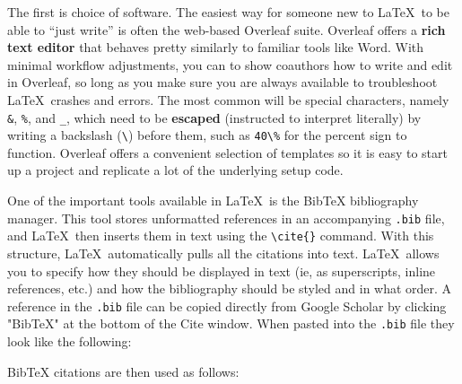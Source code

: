The first is choice of software. The easiest way
for someone new to \LaTeX\ to be able to ``just write''
is often the web-based Overleaf suite.
Overleaf offers a \textbf{rich text editor}
that behaves pretty similarly to familiar tools like Word.
With minimal workflow adjustments, you can
to show coauthors how to write and edit in Overleaf,
so long as you make sure you are always available to troubleshoot
\LaTeX\ crashes and errors.
The most common will be special characters, namely
\texttt{\&}, \texttt{\%}, and \texttt{\_},
which need to be \textbf{escaped} (instructed to interpret literally)
by writing a backslash (\texttt{\textbackslash}) before them,
such as  \texttt{40\textbackslash\%} for the percent sign to function.
Overleaf offers a convenient selection of templates
so it is easy to start up a project
and replicate a lot of the underlying setup code.

One of the important tools available in \LaTeX\ is the BibTeX bibliography manager.
This tool stores unformatted references
in an accompanying \texttt{.bib} file,
and \LaTeX\ then inserts them in text
using the \texttt{\textbackslash cite\{\}} command.
With this structure, \LaTeX\ automatically pulls
all the citations into text. \LaTeX\ allows you to specify
how they should be displayed in text
(ie, as superscripts, inline references, etc.)
and how the bibliography should be styled and in what order.
A reference in the \texttt{.bib} file
can be copied directly from Google Scholar
by clicking "BibTeX" at the bottom of the Cite window.
When pasted into the \texttt{.bib} file they look like the following:

{
}

\noindent BibTeX citations are then used as follows:

{
}

